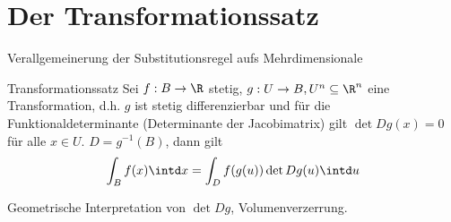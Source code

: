 \section{Der Transformationssatz}
Verallgemeinerung der Substitutionsregel aufs Mehrdimensionale


\begin{satz}{Transformationssatz}
	Sei $f:B\rightarrow \R$ stetig, $g:U\rightarrow B, U^n\subseteq \R^n$ eine Transformation, d.h. $g$ ist stetig differenzierbar und für die Funktionaldeterminante (Determinante der Jacobimatrix) gilt $\det Dg(x)=0$ für alle $x\in U$.
	$D=g^{-1}(B)$, dann gilt
	\begin{equation*}
		\int_B f(x)\intd x =\int_D f(g(u)) \det Dg(u)\intd u
	\end{equation*}
\end{satz}
Geometrische Interpretation von $\det Dg$, Volumenverzerrung.

\begin{center}
\end{center}

